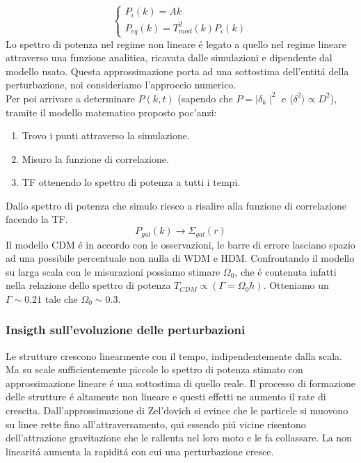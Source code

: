 \documentclass[12pt, a4paper]{article}
\begin{document}
\begin{equation}
\begin{cases}
P_i(k)=Ak
\\
P_{eq}(k)=T_{mod}^2(k)P_i(k)
\end{cases}
\end{equation}
Lo spettro di potenza nel regime non lineare \'{e} legato a quello nel regime lineare attraverso una funzione analitica, ricavata dalle simulazioni e dipendente dal modello usato. Questa approssimazione porta ad una sottostima dell'entit\'{a} della perturbazione, noi consideriamo l'approccio numerico.\\
Per poi arrivare a determinare $P(k,t)$ (sapendo che $P=\mid \delta_k\mid^2$ e $\langle \delta^2 \rangle \propto D^2$), tramite il modello matematico proposto poc'anzi:
\begin{enumerate}
\item Trovo i punti attraverso la simulazione.
\item Misuro la funzione di correlazione.
\item TF ottenendo lo spettro di potenza a tutti i tempi.
\end{enumerate}
Dallo spettro di potenza che simulo riesco a risalire alla funzione di correlazione facendo la TF.
\begin{equation}
P_{gal}(k) \longrightarrow \Sigma_{gal}(r)
\end{equation}
Il modello CDM \'{e} in accordo con le osservazioni, le barre di errore lasciano spazio ad una possibile percentuale non nulla di WDM e HDM. Confrontando il modello su larga scala con le misurazioni possiamo stimare $\Omega_0$, che \'{e} contenuta infatti nella relazione dello spettro di potenza $T_{CDM}\propto (\Gamma=\Omega_0 h)$. Otteniamo un $\Gamma\sim 0.21$ tale che $\Omega_0 \sim 0.3$.
\subsubsection{Insigth sull'evoluzione delle perturbazioni}
Le strutture crescono linearmente con il tempo, indipendentemente dalla scala. Ma su scale sufficientemente piccole lo spettro di potenza stimato con approssimazione lineare \'{e} una sottostima di quello reale. Il processo di formazione delle strutture \'{e} altamente non lineare e questi effetti ne aumento il rate di crescita. Dall'approssimazione di Zel'dovich si evince che le particele si muovono su linee rette fino all'attraversamento, qui essendo pi\'{u} vicine risentono dell'attrazione gravitazione che le rallenta nel loro moto e le fa collassare. La non linearit\'{a} aumenta la rapidit\'{a} con cui una perturbazione cresce.
\end{document}
